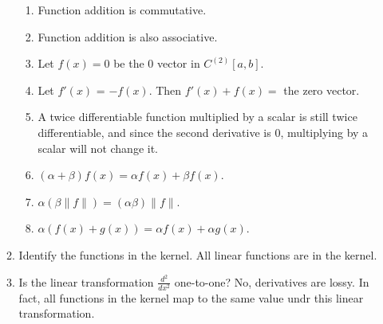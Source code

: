 \documentclass{article}
\begin{document}
\begin{enumerate}
\begin{enumerate}
\begin{enumerate}
                              \item Function addition is commutative.
                              \item Function addition is also associative.
                              \item Let $f(x)=0$ be the 0 vector in $C^{(2)}[a,b]$.
                              \item Let $f'(x)$ = $-f(x)$. Then $f'(x)+f(x)=$ the zero vector.
                              \item A twice differentiable function multiplied by a scalar is still twice differentiable,
                                    and since the second derivative is 0, multiplying by a scalar will not change it.
                              \item $(\alpha+\beta)f(x) = \alpha f(x) + \beta f(x)$.
                              \item $\alpha(\beta \lVert f\rVert) = (\alpha\beta) \lVert f\rVert$.
                              \item $\alpha (f(x)+g(x)) = \alpha f(x) + \alpha g(x)$.
                        \end{enumerate}
                  \item Identify the functions in the kernel.
                        \medbreak
                        All linear functions are in the kernel.
                  \item Is the linear transformation $\frac{d^2}{dx^2}$
                        one-to-one?
                        \medbreak
                        No, derivatives are lossy. In fact, all functions in the kernel map to
                        the same value undr this linear transformation.
            \end{enumerate}
\end{enumerate}
\end{document}
